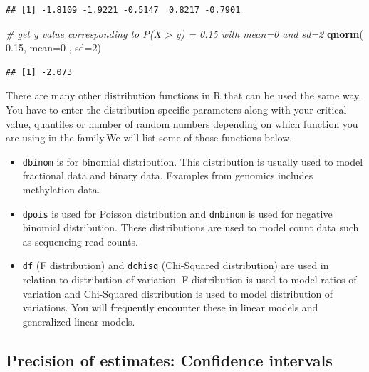 \documentclass[12pt,]{krantz}
\newenvironment{Shaded}{\begin{snugshade}}{\end{snugshade}}
\newcommand{\CommentTok}[1]{\textcolor[rgb]{0.56,0.35,0.01}{\textit{#1}}}
\newcommand{\DataTypeTok}[1]{\textcolor[rgb]{0.13,0.29,0.53}{#1}}
\newcommand{\DecValTok}[1]{\textcolor[rgb]{0.00,0.00,0.81}{#1}}
\newcommand{\FloatTok}[1]{\textcolor[rgb]{0.00,0.00,0.81}{#1}}
\newcommand{\KeywordTok}[1]{\textcolor[rgb]{0.13,0.29,0.53}{\textbf{#1}}}
\newcommand{\NormalTok}[1]{#1}
\begin{document}
\begin{verbatim}
## [1] -1.8109 -1.9221 -0.5147  0.8217 -0.7901
\end{verbatim}

\begin{Shaded}
\begin{Highlighting}[]
\CommentTok{# get y value corresponding to P(X > y) = 0.15 with  mean=0 and sd=2}
\KeywordTok{qnorm}\NormalTok{( }\FloatTok{0.15}\NormalTok{, }\DataTypeTok{mean=}\DecValTok{0}\NormalTok{ , }\DataTypeTok{sd=}\DecValTok{2}\NormalTok{)}
\end{Highlighting}
\end{Shaded}

\begin{verbatim}
## [1] -2.073
\end{verbatim}

There are many other distribution functions in R that can be used the same
way. You have to enter the distribution specific parameters along
with your critical value, quantiles or number of random numbers depending
on which function you are using in the family.We will list some of those functions below.

\begin{itemize}
\item
  \texttt{dbinom} is for binomial distribution. This distribution is usually used
  to model fractional data and binary data. Examples from genomics includes
  methylation data.
\item
  \texttt{dpois} is used for Poisson distribution and \texttt{dnbinom} is used for
  negative binomial distribution. These distributions are used to model count
  data such as sequencing read counts.
\item
  \texttt{df} (F distribution) and \texttt{dchisq} (Chi-Squared distribution) are used
  in relation to distribution of variation. F distribution is used to model
  ratios of variation and Chi-Squared distribution is used to model
  distribution of variations. You will frequently encounter these in linear models and generalized linear models.
\end{itemize}

\hypertarget{precision-of-estimates-confidence-intervals}{%
\subsection{Precision of estimates: Confidence intervals}\label{precision-of-estimates-confidence-intervals}}
\end{document}
